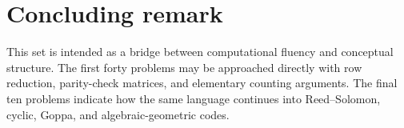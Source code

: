 \documentclass[11pt]{amsbook}
\theoremstyle{exstyle}
\theoremstyle{plain}
\begin{document}
\backmatter
\chapter*{Concluding remark}
This set is intended as a bridge between computational fluency and conceptual structure. The first forty problems may be approached directly with row reduction, parity-check matrices, and elementary counting arguments. The final ten problems indicate how the same language continues into Reed--Solomon, cyclic, Goppa, and algebraic-geometric codes.
\end{document}
